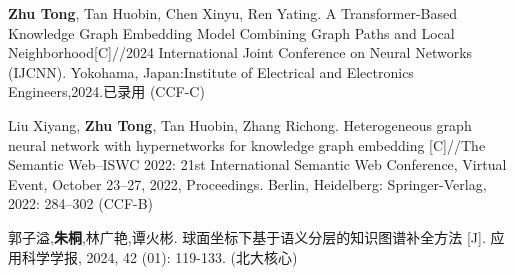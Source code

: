 \achievement

\noindent
[1] \textbf{Zhu Tong}, Tan Huobin, Chen Xinyu, Ren Yating. A Transformer-Based Knowledge Graph Embedding Model Combining Graph Paths and Local Neighborhood[C]//2024 International Joint Conference on Neural Networks (IJCNN). Yokohama, Japan:Institute of Electrical and Electronics Engineers,2024.已录用 (CCF-C)

\noindent
[2] Liu Xiyang, \textbf{Zhu Tong}, Tan Huobin, Zhang Richong. Heterogeneous graph neural network with hypernetworks
for knowledge graph embedding [C]//The Semantic Web–ISWC 2022: 21st International
Semantic Web Conference, Virtual Event, October 23–27, 2022, Proceedings. Berlin,
Heidelberg: Springer-Verlag, 2022: 284–302 (CCF-B)

\noindent
[3] 郭子溢,\textbf{朱桐},林广艳,谭火彬. 球面坐标下基于语义分层的知识图谱补全方法 [J]. 应用科学学报, 2024, 42 (01): 119-133. (北大核心)

